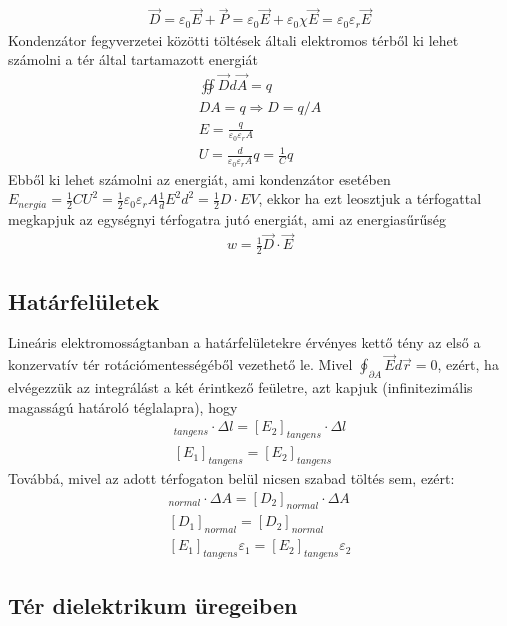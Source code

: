\documentclass{article}
\begin{document}
\begin{gather*}
\vec{D} = \varepsilon_0 \vec{E} + \vec{P} = \varepsilon_0 \vec{E} + \varepsilon_0 \chi \vec{E} = \varepsilon_0 \varepsilon_r \vec{E}
\end{gather*}
Kondenzátor fegyverzetei közötti töltések általi elektromos térből ki lehet számolni a tér által tartamazott energiát
\begin{gather*}
\oiint \vec{D} d\vec{A} = q \\
DA=q \Rightarrow D= q/A \\
E=\frac{q}{\varepsilon_0 \varepsilon_r A} \\
U = \frac{d}{\varepsilon_0 \varepsilon_r A} q=\frac{1}{C} q
\end{gather*}
Ebből ki lehet számolni az energiát, ami kondenzátor esetében $E_{nergia} = \frac{1}{2} C U^2 = \frac{1}{2} \varepsilon_0 \varepsilon_r A \frac{1}{d} E^2 d^2 = \frac{1}{2} D \cdot E V$, ekkor ha ezt leosztjuk a térfogattal megkapjuk az egységnyi térfogatra jutó energiát, ami az energiasűrűség
\begin{gather*}
w = \frac{1}{2} \vec{D} \cdot \vec{E}
\end{gather*}
\subsection{Határfelületek}
Lineáris elektromosságtanban a határfelületekre érvényes kettő tény az első a konzervatív tér rotációmentességéből vezethető le. Mivel $\oint_{\partial A} \vec{E} d\vec{r} = 0$, ezért, ha elvégezzük az integrálást a két érintkező feületre, azt kapjuk (infinitezimális magasságú határoló téglalapra), hogy
\begin{gather*}
[E_1]_{tangens} \cdot \Delta l = [E_2]_{tangens} \cdot \Delta l \\
 [E_1]_{tangens} = [E_2]_{tangens}
\end{gather*}
Továbbá, mivel az adott térfogaton belül nicsen szabad töltés sem, ezért:
\begin{gather*}
[D_1]_{normal} \cdot \Delta A = [D_2]_{normal} \cdot \Delta A \\
 [D_1]_{normal} = [D_2]_{normal} \\
 [E_1]_{tangens} \varepsilon_1 = [E_2]_{tangens} \varepsilon_2
\end{gather*}
\subsection{Tér dielektrikum üregeiben}
\end{document}
